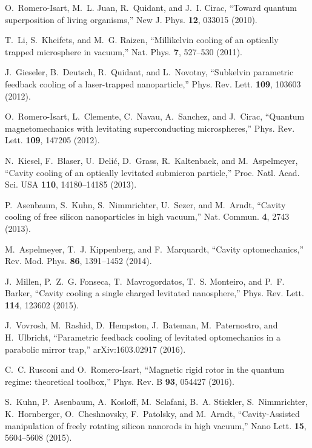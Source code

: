 \documentclass[%
 twocolumn,
 amsmath,amssymb,
 aps,
 pra,
]{revtex4-1}
\begin{document}
\begin{thebibliography}{10}
O.~Romero-Isart, M.~L. Juan, R.~Quidant, and J.~I. Cirac, \enquote{Toward
  quantum superposition of living organisms,} New J. Phys. \textbf{12}, 033015
  (2010).

T.~Li, S.~Kheifets, and M.~G. Raizen, \enquote{Millikelvin cooling of an
  optically trapped microsphere in vacuum,} Nat. Phys. \textbf{7}, 527--530
  (2011).

J.~Gieseler, B.~Deutsch, R.~Quidant, and L.~Novotny, \enquote{{Subkelvin
  parametric feedback cooling of a laser-trapped nanoparticle},} Phys. Rev.
  Lett. \textbf{109}, 103603 (2012).

O.~Romero-Isart, L.~Clemente, C.~Navau, A.~Sanchez, and J.~Cirac,
  \enquote{Quantum magnetomechanics with levitating superconducting
  microspheres,} Phys. Rev. Lett. \textbf{109}, 147205 (2012).

N.~Kiesel, F.~Blaser, U.~Deli{\'c}, D.~Grass, R.~Kaltenbaek, and M.~Aspelmeyer,
  \enquote{{Cavity cooling of an optically levitated submicron particle},}
  Proc. Natl. Acad. Sci. USA \textbf{110}, 14180--14185 (2013).

P.~Asenbaum, S.~Kuhn, S.~Nimmrichter, U.~Sezer, and M.~Arndt, \enquote{{Cavity
  cooling of free silicon nanoparticles in high vacuum},} Nat. Commun.
  \textbf{4}, 2743 (2013).

M.~Aspelmeyer, T.~J. Kippenberg, and F.~Marquardt, \enquote{{Cavity
  optomechanics},} Rev. Mod. Phys. \textbf{86}, 1391--1452 (2014).

J.~Millen, P.~Z.~G. Fonseca, T.~Mavrogordatos, T.~S. Monteiro, and P.~F.
  Barker, \enquote{{Cavity cooling a single charged levitated nanosphere},}
  Phys. Rev. Lett. \textbf{114}, 123602 (2015).

J.~Vovrosh, M.~Rashid, D.~Hempston, J.~Bateman, M.~Paternostro, and
  H.~Ulbricht, \enquote{Parametric feedback cooling of levitated optomechanics
  in a parabolic mirror trap,} arXiv:1603.02917  (2016).

C.~C. Rusconi and O.~Romero-Isart, \enquote{Magnetic rigid rotor in the quantum
  regime: theoretical toolbox,} Phys. Rev. B \textbf{93}, 054427 (2016).

S.~Kuhn, P.~Asenbaum, A.~Kosloff, M.~Sclafani, B.~A. Stickler, S.~Nimmrichter,
  K.~Hornberger, O.~Cheshnovsky, F.~Patolsky, and M.~Arndt,
  \enquote{{Cavity-Assisted manipulation of freely rotating silicon nanorods in
  high vacuum},} Nano Lett. \textbf{15}, 5604--5608 (2015).


\end{thebibliography}
\end{document}
